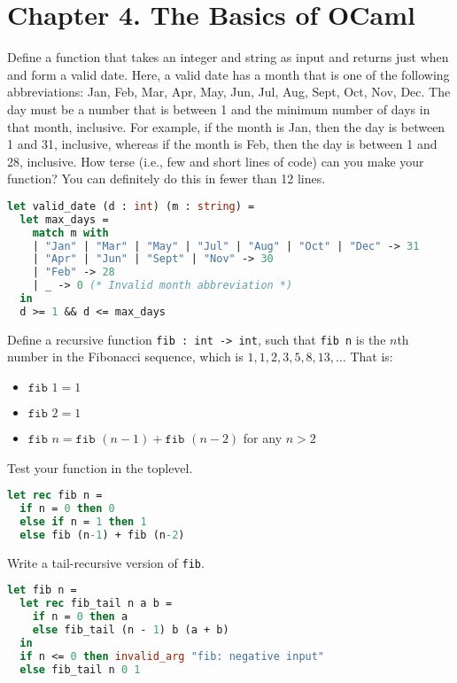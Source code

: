 
\section*{Chapter 4. The Basics of OCaml}

Define a function that takes an integer  and string  as input and returns  just when  and  form a valid date. Here, a valid date has a month that is one of the following abbreviations: Jan, Feb, Mar, Apr, May, Jun, Jul, Aug, Sept, Oct, Nov, Dec. The day must be a number that is between 1 and the minimum number of days in that month, inclusive. For example, if the month is Jan, then the day is between 1 and 31, inclusive, whereas if the month is Feb, then the day is between 1 and 28, inclusive. How terse (i.e., few and short lines of code) can you make your function? You can definitely do this in fewer than 12 lines.

\begin{lstlisting}[language=Caml]
let valid_date (d : int) (m : string) =
  let max_days =
    match m with
    | "Jan" | "Mar" | "May" | "Jul" | "Aug" | "Oct" | "Dec" -> 31
    | "Apr" | "Jun" | "Sept" | "Nov" -> 30
    | "Feb" -> 28
    | _ -> 0 (* Invalid month abbreviation *)
  in
  d >= 1 && d <= max_days
\end{lstlisting}

\problem[fib]
Define a recursive function \texttt{fib : int -> int}, such that \texttt{fib n} is the $n$th number in the Fibonacci sequence,
which is $1, 1, 2, 3, 5, 8, 13, \ldots$ That is:
\begin{itemize}
  \item $\texttt{fib } 1 = 1$
  \item $\texttt{fib } 2 = 1$
  \item $\texttt{fib } n = \texttt{fib } (n-1) + \texttt{fib } (n-2)$ for any $n > 2$
\end{itemize}
Test your function in the toplevel.

\begin{lstlisting}[language=Caml]
let rec fib n =
  if n = 0 then 0
  else if n = 1 then 1
  else fib (n-1) + fib (n-2)
\end{lstlisting}

Write a tail-recursive version of \texttt{fib}.

\begin{lstlisting}[language=Caml]
let fib n =
  let rec fib_tail n a b =
    if n = 0 then a
    else fib_tail (n - 1) b (a + b)
  in
  if n <= 0 then invalid_arg "fib: negative input"
  else fib_tail n 0 1
\end{lstlisting}

